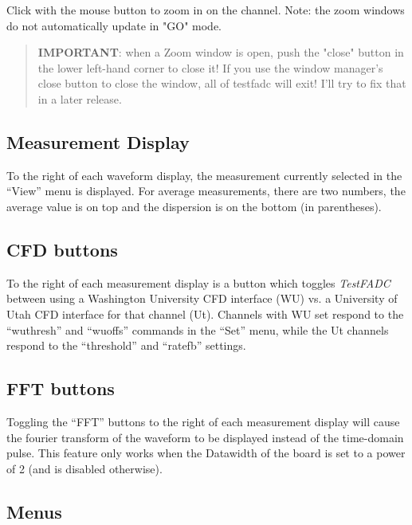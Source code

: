 \documentclass{article}
\newcommand{\testfadc}{\emph{TestFADC} }
\begin{document}
Click with the  mouse button to zoom in on the channel.  Note: the
zoom windows do not automatically update in "GO" mode. 

\begin{quote}
  \textbf{IMPORTANT}: when a Zoom window is open, push the "close" button
  in the lower left-hand corner to close it!  If you use the
  window manager's close button to close the window, all of
  testfadc will exit!  I'll try to fix that in a later release.
\end{quote}


\subsection{Measurement Display}

To the right of each waveform display, the measurement currently
selected in the ``View'' menu  is displayed.  For average
measurements, there are two numbers, the average value is on top and
the dispersion is on the bottom (in parentheses).

\subsection{CFD buttons}

To the right of each measurement display is a button which toggles \testfadc
between using a Washington University CFD interface (WU) vs. a University
of Utah CFD interface for that channel (Ut).  Channels with WU set
respond to the ``wuthresh'' and ``wuoffs'' commands in the ``Set''
menu, while the Ut channels respond to the ``threshold'' and
``ratefb'' settings.

\subsection{FFT buttons}

Toggling the ``FFT'' buttons to the right of each measurement display
will cause the fourier transform of the waveform to be displayed
instead of the time-domain pulse.  This feature only works when the
Datawidth of the board is set to a power of 2 (and is disabled
otherwise).

\subsection{Menus}
\end{document}
